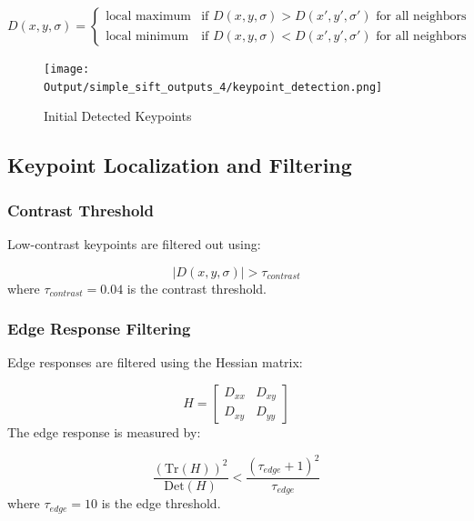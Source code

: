 \documentclass[12pt,a4paper]{article}
\begin{document}
\begin{equation}
D(x,y,\sigma) = \begin{cases}
\text{local maximum} & \text{if } D(x,y,\sigma) > D(x',y',\sigma') \text{ for all neighbors} \\
\text{local minimum} & \text{if } D(x,y,\sigma) < D(x',y',\sigma') \text{ for all neighbors}
\end{cases}
\end{equation}

\begin{figure}[!ht]
    \centering
    \texttt{[image: Output/simple\_sift\_outputs\_4/keypoint\_detection.png]}
    \caption{Initial Detected Keypoints}
    \label{fig:fig3}
\end{figure}

\subsection{Keypoint Localization and Filtering}

\subsubsection{Contrast Threshold}

Low-contrast keypoints are filtered out using:

\begin{equation}
|D(x,y,\sigma)| > \tau_{contrast}
\end{equation}
where $\tau_{contrast} = 0.04$ is the contrast threshold.

\subsubsection{Edge Response Filtering}

Edge responses are filtered using the Hessian matrix:

\begin{equation}
H = \begin{bmatrix}
D_{xx} & D_{xy} \\
D_{xy} & D_{yy}
\end{bmatrix}
\end{equation}
The edge response is measured by:

\begin{equation}
\frac{(\text{Tr}(H))^2}{\text{Det}(H)} < \frac{(\tau_{edge} + 1)^2}{\tau_{edge}}
\end{equation}
where $\tau_{edge} = 10$ is the edge threshold.
\end{document}
